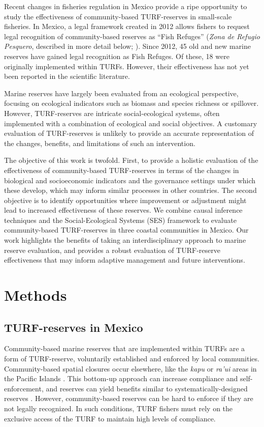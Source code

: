\documentclass[10pt,letterpaper]{article}
\begin{document}
Recent changes in fisheries regulation in Mexico provide a ripe opportunity to study the effectiveness of community-based TURF-reserves in small-scale fisheries. In Mexico, a legal framework created in 2012 allows fishers to request legal recognition of community-based reserves as “Fish Refuges” (\emph{Zona de Refugio Pesquero}, described in more detail below; \cite{nom}). Since 2012, 45 old and new marine reserves have gained legal recognition as Fish Refuges. Of these, 18 were originally implemented within TURFs. However, their effectiveness has not yet been reported in the scientific literature.

Marine reserves have largely been evaluated from an ecological perspective, focusing on ecological indicators such as biomass and species richness or spillover\cite{halpern_2002,lester_2009,krueck_2017-J1}. However, TURF-reserves are intricate social-ecological systems, often implemented with a combination of ecological and social objectives. A customary evaluation of TURF-reserves is unlikely to provide an accurate representation of the changes, benefits, and limitations of such an intervention.

The objective of this work is twofold. First, to provide a holistic evaluation of the effectiveness of community-based TURF-reserves in terms of the changes in biological and socioeconomic indicators and the governance settings under which these develop, which may inform similar processes in other countries. The second objective is to identify opportunities where improvement or adjustment might lead to increased effectiveness of these reserves. We combine causal inference techniques and the Social-Ecological Systems (SES) framework to evaluate community-based TURF-reserves in three coastal communities in Mexico.  Our work highlights the benefits of taking an interdisciplinary approach to marine reserve evaluation, and provides a robust evaluation of TURF-reserve effectiveness that may inform adaptive management and future interventions.

\section*{Methods}

\subsection*{TURF-reserves in Mexico}

Community-based marine reserves that are implemented within TURFs are a form of TURF-reserve, voluntarily established and enforced by local communities. Community-based spatial closures occur elsewhere, like the \emph{kapu} or \emph{ra’ui} areas in the Pacific Islands \cite{johannes_2002,bohnsack_2004}. This bottom-up approach can increase compliance and self-enforcement, and reserves can yield benefits similar to systematically-designed reserves \cite{beger_2004,smallhornwest_2018}. However, community-based reserves can be hard to enforce if they are not legally recognized. In such conditions, TURF fishers must rely on the exclusive access of the TURF to maintain high levels of compliance.
\end{document}
